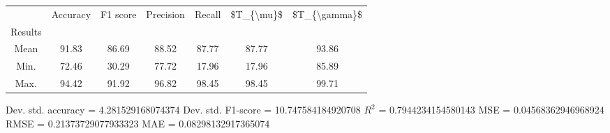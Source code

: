 \begin{tabular}{|c|c|c|c|c|c|c|}
\toprule
{} &  Accuracy &  F1 score &  Precision &  Recall &  \$T\_\{\textbackslash mu\}\$ &  \$T\_\{\textbackslash gamma\}\$ \\
Results &           &           &            &         &            &               \\
\hline
Mean    &     91.83 &     86.69 &      88.52 &   87.77 &      87.77 &         93.86 \\
Min.    &     72.46 &     30.29 &      77.72 &   17.96 &      17.96 &         85.89 \\
Max.    &     94.42 &     91.92 &      96.82 &   98.45 &      98.45 &         99.71 \\
\bottomrule
\end{tabular}

 Dev. std. accuracy = 4.281529168074374
 Dev. std. F1-score = 10.747584184920708
 $R^2$ = 0.7944234154580143
 MSE = 0.04568362946968924
 RMSE = 0.21373729077933323
 MAE = 0.08298132917365074